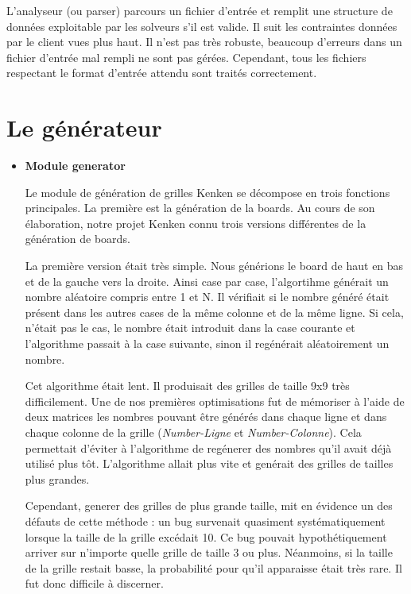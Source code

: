 \documentclass[1]{report}
\begin{document}
        L'analyseur (ou parser) parcours un fichier d'entrée et remplit une structure de données exploitable par les solveurs s'il est valide. Il suit les contraintes données par le client vues plus haut. Il n'est pas très robuste, beaucoup d'erreurs dans un fichier d'entrée mal rempli ne sont pas gérées. Cependant, tous les fichiers respectant le format d'entrée attendu sont traités correctement.

    \section{Le générateur}

        \begin{itemize}
            \item{\textbf{Module generator}} \newline

        Le module de génération de grilles Kenken se décompose en trois fonctions principales. La première est la génération de la boards. Au cours de son élaboration, notre projet Kenken connu trois versions différentes de la génération de boards. \newline
        
        La première version était très simple. Nous générions le board de haut en bas et de la gauche vers la droite. Ainsi case par case, l'algortihme générait un nombre aléatoire compris entre 1 et N. Il vérifiait si le nombre généré était présent dans les autres cases de la même colonne et de la même ligne. Si cela, n'était pas le cas, le nombre était introduit dans la case courante et l'algorithme passait à la case suivante, sinon il regénérait aléatoirement un nombre. \newline
        
        Cet algorithme était lent. Il produisait des grilles de taille 9x9 très difficilement. Une de nos premières optimisations fut de mémoriser à l'aide de deux matrices les nombres pouvant être générés dans chaque ligne et dans chaque colonne de la grille (\textit{Number-Ligne} et \textit{Number-Colonne}). Cela permettait d'éviter à l'algorithme de regénerer des nombres qu'il avait déjà utilisé plus tôt.
        L'algorithme allait plus vite et genérait des grilles de tailles plus grandes. \newline
        
        Cependant, generer des grilles de plus grande taille, mit en évidence un des défauts de cette méthode : un bug survenait quasiment systématiquement lorsque la taille de la grille excédait 10. Ce bug pouvait hypothétiquement arriver sur n'importe quelle grille de taille 3 ou plus. Néanmoins, si la taille de la grille restait basse, la probabilité pour qu'il apparaisse était très rare. Il fut donc difficile à discerner. \newline
        

\end{itemize}
\end{document}
